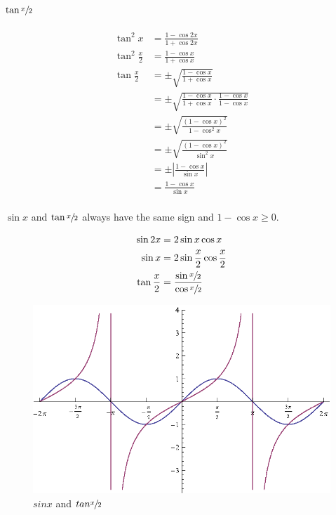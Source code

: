 \documentclass{exam}
\begin{document}
  \subsection{$\tan \sfrac{x}{2}$}
  \begin{align*}
    \tan^2 x           & = \frac{1 - \cos 2x}{1 + \cos 2x} \\
    \tan^2 \frac{x}{2} & = \frac{1 - \cos x}{1 + \cos x} \\
    \tan \frac{x}{2}   & = \pm \sqrt{ \frac{1 - \cos x}{1 + \cos x} } \\
                       & = \pm \sqrt{ \frac{1 - \cos x}{1 + \cos x} \cdot \frac{1 - \cos x}{1 - \cos x} } \\
                       & = \pm \sqrt{ \frac{(1 - \cos x)^2}{1 - \cos^2 x} } \\
                       & = \pm \sqrt{ \frac{(1 - \cos x)^2}{\sin^2 x} } \\
                       & = \pm \left| \frac{1 - \cos x}{\sin x} \right| \\
                       & = \frac{1 - \cos x}{\sin x} \\
  \end{align*}

  $\sin x$ and $\tan \sfrac{x}{2}$ always have the same sign and $1 - \cos x \geq 0$.

  \begin{align*}
    \sin 2x          & = 2 \sin x \cos x \\
    \sin x           & = 2 \sin \frac{x}{2} \cos \frac{x}{2} \\
    \tan \frac{x}{2} & = \frac{\sin \sfrac{x}{2}}{\cos \sfrac{x}{2}} \\
  \end{align*}

  \begin{figure}[H]
    \centering
    \includegraphics[scale=0.8]{sinx_tanx2}
    \caption{$sin x$ and $tan \sfrac{x}{2}$}
  \end{figure}
\end{document}
